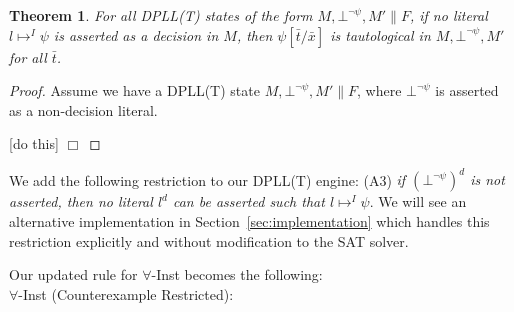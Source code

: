 \documentclass{llncs}
\newtheorem{thm}{Theorem}
\begin{document}
\begin{thm}
For all DPLL(T) states of the form $M, \bot^{\neg \psi}, M' \parallel F$, if no literal $l \mapsto^I \psi$ is asserted as a decision in $M$, then $\psi[\bar{t}/\bar{x}]$ is tautological in $M, \bot^{\neg \psi}, M'$ for all $\bar{t}$.
\end{thm}
\begin{proof}
Assume we have a DPLL(T) state $M, \bot^{\neg \psi}, M' \parallel F$, where $\bot^{\neg \psi}$ is asserted as a non-decision literal.

\begin{comment}
Say that $\psi$ has DNF-conversion $\forall \bar{x}. (S_1 \vee \ldots \vee S_n)$, and thus $F \models \displaystyle\bigwedge\limits_{i=1}^n ( \neg \psi \vee \bot^{\neg \psi} \vee \displaystyle\bigvee\limits_{l_j \in S_i} \neg l_j[\bar{e}/\bar{x}])$.
By Invariant 1, the literal $\bot^{\neg \psi}$ only occurs in such clauses in $F$.

Consider the case where $\bot^{\neg \psi}$ was asserted by unit-propagation.
Then $M \models \neg ( \neg \psi \vee \displaystyle\bigvee\limits_{l_j \in S_i} \neg l_j[\bar{e}/\bar{x}] )$ for some $S_i$.
We know that $\psi \in M$, and since no literal $l \mapsto^I \psi$ is asserted as a decision in $M$, we know that there exists an $M' \subseteq M$ such that $M'$ does not contain $\bar{e}$, and $M', F' \models \neg \displaystyle\bigvee\limits_{l_j \in S_i} \neg l_j[\bar{e}/\bar{x}]$, where $F' \subseteq F$ is the set of (tautological) clauses containing $\bar{e}$.
Therefore, we know that $M' \models \forall \bar{x}. S_i$ (since $\bar{e} \not\in M'$) and thus $\psi[\bar{t}/\bar{x}]$ is tautological in $M' \subseteq M$.

Consider the case where $\bot^{\neg \psi}$ was asserted due to a backjump.
\end{comment}
[do this] $\Box$
\end{proof}

We add the following restriction to our DPLL(T) engine: (A3) \emph{if $(\bot^{\neg \psi})^d$ is not asserted, then no literal $l^d$ can be asserted such that $l \mapsto^I \psi$}.
We will see an alternative implementation in Section~\ref{sec:implementation} which handles this restriction explicitly and without modification to the SAT solver.

Our updated rule for $\forall$-Inst becomes the following: \\

\noindent $\forall$-Inst (Counterexample Restricted): \\
\end{document}
